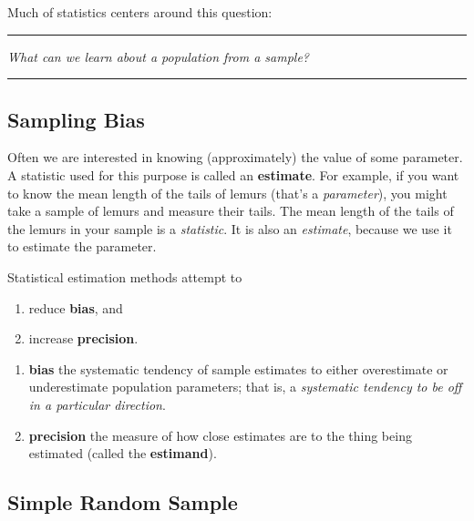 \documentclass[]{book}
\providecommand{\tightlist}{%
  \setlength{\itemsep}{0pt}\setlength{\parskip}{0pt}}
\begin{document}
Much of statistics centers around this question:

\begin{center}\rule{0.5\linewidth}{\linethickness}\end{center}

\emph{What can we learn about a population from a sample?}

\begin{center}\rule{0.5\linewidth}{\linethickness}\end{center}

\hypertarget{sampling-bias}{%
\subsection{Sampling Bias}\label{sampling-bias}}

Often we are interested in knowing (approximately) the value of some parameter. A statistic used for this purpose is called an \textbf{estimate}. For example, if you want to know the mean length of the tails of lemurs (that's a \emph{parameter}), you might take a sample of lemurs and measure their tails. The mean length of the tails of the lemurs in your sample is a \emph{statistic}. It is also an \emph{estimate}, because we use it to estimate the parameter.

Statistical estimation methods attempt to

\begin{enumerate}
\tightlist
\item
  reduce \textbf{bias}, and
\item
  increase \textbf{precision}.
\end{enumerate}

\begin{enumerate}
\tightlist
\item
  \textbf{bias}
  the systematic tendency of sample estimates to either overestimate or underestimate population parameters; that is, a \emph{systematic tendency to be off in a particular direction}.
\item
  \textbf{precision}
  the measure of how close estimates are to the thing being estimated (called the \textbf{estimand}).
\end{enumerate}

\hypertarget{simple-random-sample}{%
\subsection{Simple Random Sample}\label{simple-random-sample}}
\end{document}
